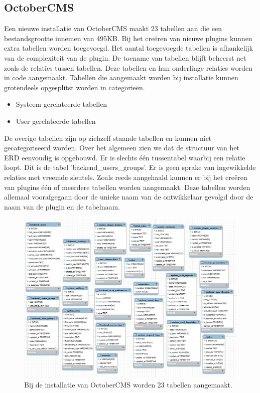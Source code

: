 \subsection{OctoberCMS}
Een nieuwe installatie van OctoberCMS maakt 23 tabellen aan die een bestandsgrootte innemen van 495KB. Bij het creëren van nieuwe plugins kunnen extra tabellen worden toegevoegd. Het aantal toegevoegde tabellen is afhankelijk van de complexiteit van de plugin. De toename van tabellen blijft beheerst net zoals de relaties tussen tabellen. Deze tabellen en hun onderlinge relaties worden in code aangemaakt. Tabellen die aangemaakt worden bij installatie kunnen grotendeels opgesplitst worden in categorieën.

\begin{itemize}
	\item{Systeem gerelateerde tabellen}
    \item{User gerelateerde tabellen}
\end{itemize}

\noindent
De overige tabellen zijn op zichzelf staande tabellen en kunnen niet gecategoriseerd worden. Over het algemeen zien we dat de structuur van het ERD eenvoudig is opgebouwd. Er is slechts één tussentabel waarbij een relatie loopt. Dit is de tabel 'backend\_users\_groups'. Er is geen sprake van ingewikkelde relaties met vreemde sleutels.
\newline\newline
Zoals reeds aangehaald kunnen er bij het creëren van plugins één of meerdere tabellen worden aangemaakt. Deze tabellen worden allemaal voorafgegaan door de unieke naam van de ontwikkelaar gevolgd door de naam van de plugin en de tabelnaam. 


\begin{figure}[!ht]
  \includegraphics[width=\textwidth]{img/oc-database-erd.png}
  \caption{Bij de installatie van OctoberCMS worden 23 tabellen aangemaakt.}
  \label{fig:OctoberCMS core ERD.}
\end{figure}

